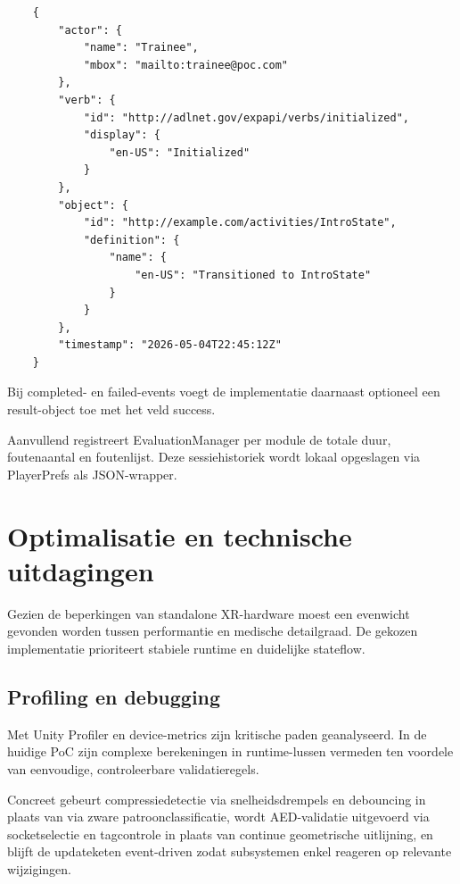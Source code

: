 \begin{listing}[ht]
    \begin{verbatim}
    {
        "actor": {
            "name": "Trainee",
            "mbox": "mailto:trainee@poc.com"
        },
        "verb": {
            "id": "http://adlnet.gov/expapi/verbs/initialized",
            "display": {
                "en-US": "Initialized"
            }
        },
        "object": {
            "id": "http://example.com/activities/IntroState",
            "definition": {
                "name": {
                    "en-US": "Transitioned to IntroState"
                }
            }
        },
        "timestamp": "2026-05-04T22:45:12Z"
    }
    \end{verbatim}
\caption{Voorbeeld van een xAPI-geinspireerd log-fragment.}
\label{listing:logging}
\end{listing}

Bij completed- en failed-events voegt de implementatie daarnaast optioneel een result-object toe met het veld success.

Aanvullend registreert EvaluationManager per module de totale duur, foutenaantal en foutenlijst. Deze sessiehistoriek wordt lokaal opgeslagen via PlayerPrefs als JSON-wrapper.

\section{Optimalisatie en technische uitdagingen}

Gezien de beperkingen van standalone XR-hardware moest een evenwicht gevonden worden tussen performantie en medische detailgraad. De gekozen implementatie prioriteert stabiele runtime en duidelijke stateflow.

\subsection{Profiling en debugging}

Met Unity Profiler en device-metrics zijn kritische paden geanalyseerd. In de huidige PoC zijn complexe berekeningen in runtime-lussen vermeden ten voordele van eenvoudige, controleerbare validatieregels.

Concreet gebeurt compressiedetectie via snelheidsdrempels en debouncing in plaats van via zware patroonclassificatie, wordt AED-validatie uitgevoerd via socketselectie en tagcontrole in plaats van continue geometrische uitlijning, en blijft de updateketen event-driven zodat subsystemen enkel reageren op relevante wijzigingen.

